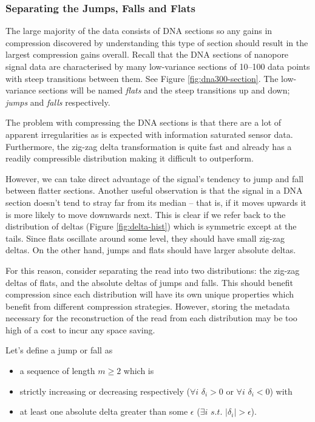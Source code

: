 

\subsubsection{Separating the Jumps, Falls and Flats}



The large majority of the data consists of DNA sections so any gains in
compression discovered by understanding this type of section should
result in the largest compression gains overall. Recall that the DNA sections of
nanopore signal data are characterised by many low-variance sections of 10--100
data points with steep transitions between them. See Figure
\ref{fig:dna300-section}. The low-variance sections will be named \textit{flats}
and the steep transitions up and down; \textit{jumps} and \textit{falls}
respectively.

The problem with compressing the DNA sections is that there are a lot of
apparent irregularities as is expected with information saturated sensor data.
Furthermore, the zig-zag delta transformation is quite fast and already has a
readily compressible distribution making it difficult to outperform.

However, we can take direct advantage of the signal's tendency to jump and fall
between flatter sections. Another useful observation is that the signal in a DNA
section doesn't tend to stray far from its median -- that is, if it moves
upwards it is more likely to move downwards next. This is clear if we refer back
to the distribution of deltas (Figure \ref{fig:delta-hist}) which is symmetric
except at the tails. Since flats oscillate around some level, they should have
small zig-zag deltas. On the other hand, jumps and flats should have larger
absolute deltas.

For this reason, consider separating the read into two distributions: the
zig-zag deltas of flats, and the absolute deltas of jumps and falls. This should
benefit compression since each distribution will have its own unique properties
which benefit from different compression strategies. However, storing the
metadata necessary for the reconstruction of the read from each distribution may
be too high of a cost to incur any space saving.

Let's define a jump or fall as
\begin{itemize}
	\item a sequence of length $m\ge 2$ which is
	\item strictly increasing or decreasing respectively ($\forall i$ $\delta_i>0$ or $\forall i$ $\delta_i < 0$) with
	\item at least one absolute delta greater than some $\epsilon$ ($\exists i$ $s.t.$ $|\delta_i|>\epsilon$).
\end{itemize}

